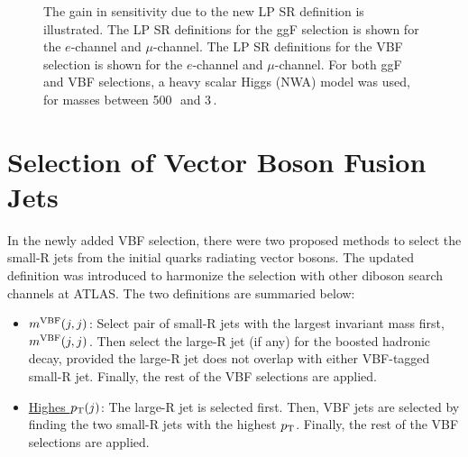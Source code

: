 \begin{figure}[tbp]
\caption[Low purity region definition optimization]{The gain in sensitivity due to the new LP SR definition is illustrated. The LP SR definitions for the ggF selection is shown for the \protect{} $e$-channel  and \protect{} $\mu$-channel. The LP SR definitions for the VBF selection is shown for the \protect{} $e$-channel and \protect{} $\mu$-channel. For both ggF and VBF selections, a heavy scalar Higgs (NWA) model was used, for masses between 500\,\GeV\, and 3\,\TeV.}
\label{fig:lp_sr_def}
\end{figure}

%
\clearpage
\section{Selection of  Vector Boson Fusion Jets}
\label{ch:opt:vbf}
In the newly added VBF selection, there were two proposed methods to select the small-R jets from the initial quarks radiating vector bosons.  The updated definition was introduced to harmonize the selection with other diboson search channels at ATLAS. The two definitions are summaried below:
\begin{itemize}
\item\underline{$m^{\rm VBF}(j,j)$}: Select pair of small-R jets with the largest invariant mass first, $m^{\rm VBF}(j,j)$. Then select the large-R jet (if any) for the boosted hadronic decay, provided the large-R jet does not overlap with either VBF-tagged small-R jet. Finally, the rest of the VBF selections are applied.
\item\underline{Highes $p_{\text{T}}(j)$}: The large-R jet is selected first. Then, VBF jets are selected by finding the two small-R jets with the highest $p_{\text{T}}$. Finally, the rest of the VBF selections are applied.
\end{itemize}


